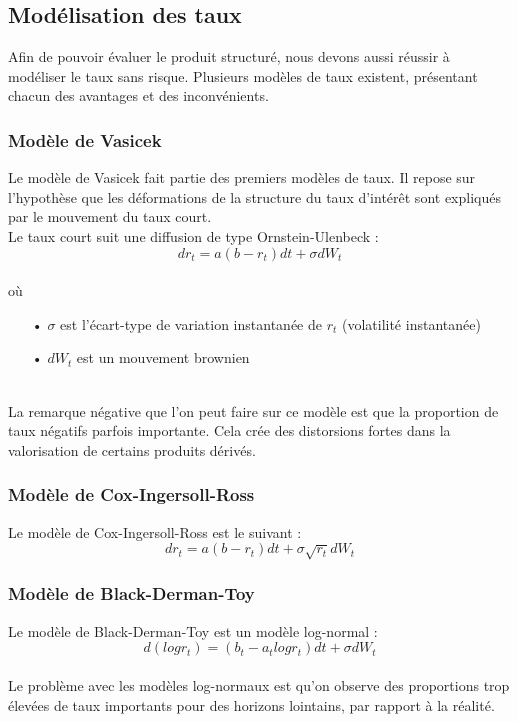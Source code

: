 \documentclass[french,12pt,a4paper]{article}
\begin{document}
\subsection{Modélisation des taux}

Afin de pouvoir évaluer le produit structuré, nous devons aussi réussir à modéliser le taux sans risque. Plusieurs modèles de taux existent, présentant chacun des avantages et des inconvénients.

\subsubsection{Modèle de Vasicek}
Le modèle de Vasicek fait partie des premiers modèles de taux. Il repose sur l'hypothèse que les déformations de la structure du taux d'intérêt sont expliqués par le mouvement du taux court.\\
Le taux court suit une diffusion de type Ornstein-Ulenbeck : \\
$$ dr_{t} = a(b-r_{t})dt + \sigma dW_{t} $$ \\
où
\begin{itemize}
\item[•] $\sigma$ est l'écart-type de variation instantanée de $r_{t}$ (volatilité instantanée)
\item[•] $dW_{t}$ est un mouvement brownien
\end{itemize}
\\

La remarque négative que l'on peut faire sur ce modèle est que la proportion de taux négatifs parfois importante. Cela crée des distorsions fortes dans la valorisation de certains produits dérivés.\\

\subsubsection{Modèle de Cox-Ingersoll-Ross}
Le modèle de Cox-Ingersoll-Ross est le suivant :
$$ dr_{t} = a(b-r_{t})dt + \sigma \sqrt{r_{t}} dW_{t} $$

\subsubsection{Modèle de Black-Derman-Toy}
Le modèle de Black-Derman-Toy est un modèle log-normal :
$$ d(logr_{t}) = (b_{t} - a_{t} logr_{t})dt + \sigma dW_{t} $$ \\

Le problème avec les modèles log-normaux est qu'on observe des proportions trop élevées de taux importants pour des horizons lointains, par rapport à la réalité.\\
\end{document}
